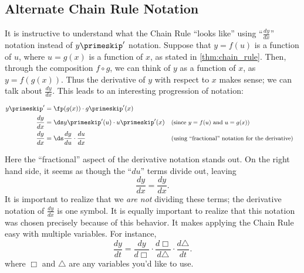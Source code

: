 

\subsection{Alternate Chain Rule Notation}

It is instructive to understand what the  Chain Rule ``looks like'' using ``$\frac{dy}{dx}$'' notation instead of $y\primeskip'$ notation.  Suppose that $y=f(u)$ is a function of $u$, where $u=g(x)$ is a function of $x$, as stated in \autoref{thm:chain_rule}.  Then, through the composition $f \circ g$, we can think of $y$ as a function of $x$, as $y=f(g(x))$. Thus the derivative of $y$ with respect to $x$ makes sense; we can talk about $\frac{dy}{dx}.$  This leads to an interesting progression of notation:

\begin{align*}
 y\primeskip'
 &= \fp(g(x))\cdot g\primeskip'(x) \\
 \frac{dy}{dx} &= \ds y\primeskip'(u) \cdot u\primeskip'(x)
 &&\text{\small (since $y=f(u)$ and $u=g(x)$)}\\
 \frac{dy}{dx} &= \ds \frac{dy}{du} \cdot \frac{du}{dx}
 &&\text{\small (using ``fractional'' notation for the derivative)}
\end{align*}


Here the ``fractional'' aspect of the derivative notation stands out. On the right hand side, it seems as though the ``$du$'' terms divide out, leaving
\[\frac{dy}{dx} = \frac{dy}{dx}.\]
It is important to realize that we \textit{are not} dividing these terms; the derivative notation of $\frac{dy}{dx}$ is one symbol. It is equally important to realize that this notation was chosen precisely because of this behavior. It makes applying the Chain Rule easy with multiple variables. For instance,
%
\[
 \frac{dy}{dt}
 =\frac{dy}{d\Box}\cdot\frac{d\Box}{d\triangle}\cdot\frac{d\triangle}{dt}.
\]
where $\Box$ and $\triangle$ are any variables you'd like to use.

